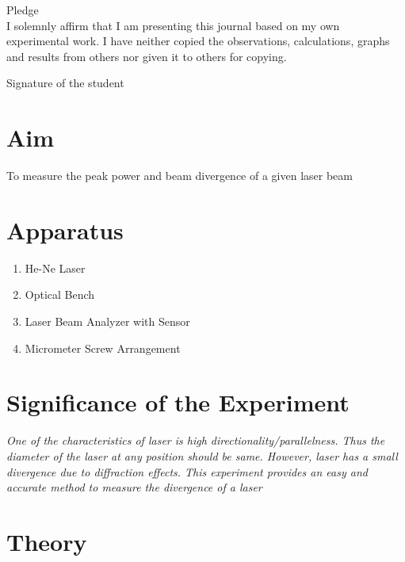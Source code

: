 \documentclass[11pt]{article}
\begin{document}
	\begin{center}
	{\Large Pledge}\\
	\vspace{0.5cm}
	I solemnly affirm that I am presenting this journal based on my own experimental work. I have neither copied the observations, calculations, graphs and results from others nor given it to others for copying.\\
		\end{center}
	
	\vspace{0.5cm}
	
    \begin{flushright}
	{\large Signature of the student}\\
	\vspace{1cm}
	 \end{flushright}
	
	\section{Aim}
	\noindent
	To measure the peak power and beam divergence of a given laser beam

	
	\section{Apparatus}


		\begin{enumerate}
			\item He-Ne Laser
			\item Optical Bench
			\item Laser Beam Analyzer with Sensor
			\item Micrometer Screw Arrangement
		\end{enumerate}


	\section{Significance of the Experiment}
	\textit{One of the characteristics of laser is high
	directionality/parallelness. Thus the diameter of the laser at any position should be same.
	However, laser has a small divergence due to diffraction effects. This experiment provides an	
	easy and accurate method to measure the divergence of a laser}
	
	
	\section{Theory}
\end{document}
